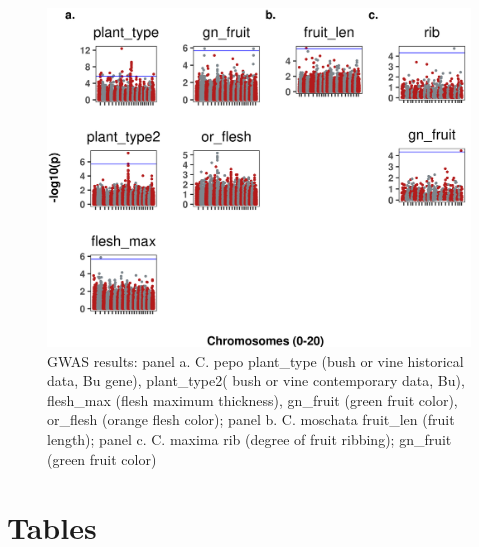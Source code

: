 \documentclass[utf8]{FrontiersinHarvard} %
\begin{document}
\begin{figure}[h]
	\begin{center}
		\includegraphics[width=15cm]{../../figures/04_fig.png}%
	\end{center}
	\caption{GWAS results: panel a. C. pepo plant\_type (bush or vine historical data, Bu gene), plant\_type2( bush or vine contemporary data, Bu), flesh\_max (flesh maximum thickness), gn\_fruit (green fruit color), or\_flesh (orange flesh color); panel b. C. moschata fruit\_len (fruit length); panel c. C. maxima rib (degree of fruit ribbing); gn\_fruit (green fruit color) \label{fig:4}}
\end{figure}








\newpage

\section*{Tables}
\end{document}
